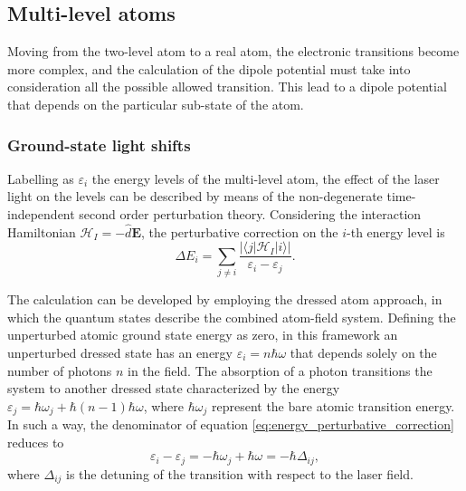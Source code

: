\subsection{Multi-level atoms}

Moving from the two-level atom to a real atom, the electronic transitions become more complex, and the calculation of the dipole potential must take into consideration all the possible allowed transition. This lead to a dipole potential that depends on the particular sub-state of the atom.

\subsubsection{Ground-state light shifts}
Labelling as $\varepsilon_i$ the energy levels of the multi-level atom, the effect of the laser light on the levels can be described by means of the non-degenerate time-independent second order perturbation theory. Considering the interaction Hamiltonian $\mathcal{H}_I=-\hat{d}\mathbf{E}$, the perturbative correction on the $i$-th energy level is
\begin{equation}
    \label{eq:energy_perturbative_correction}
    \Delta E_i = \sum_{j \neq i} \frac{|\langle j | \mathcal{H}_I | i\rangle|}{\varepsilon_i - \varepsilon_j}.
\end{equation}

The calculation can be developed by employing the dressed atom approach, in which the quantum states describe the combined atom-field system. Defining the unperturbed atomic ground state energy as zero, in this framework an unperturbed dressed state has an energy $\varepsilon_i=n\hbar\omega$ that depends solely on the number of photons $n$ in the field. The absorption of a photon transitions the system to another dressed state characterized by the energy $\varepsilon_j=\hbar\omega_{j} + \hbar(n-1)\hbar\omega$, where $\hbar\omega_{j}$ represent the bare atomic transition energy. In such a way, the denominator of equation \eqref{eq:energy_perturbative_correction} reduces to
\begin{equation}
    \label{eq:perturbative_expantion_denominator}
    \varepsilon_i - \varepsilon_j = -\hbar\omega_j + \hbar\omega = -\hbar\Delta_{ij}, 
\end{equation}
where $\Delta_{ij}$ is the detuning of the transition with respect to the laser field.

